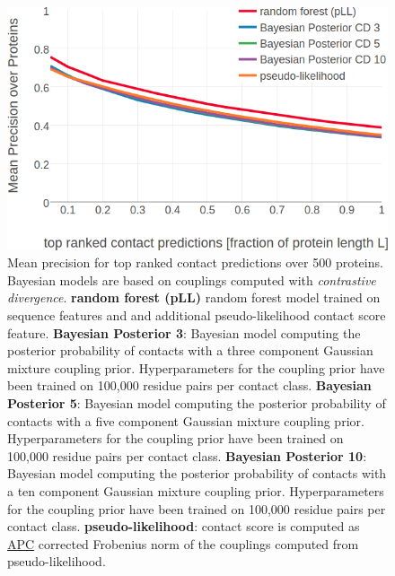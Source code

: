 \documentclass[11pt,a4paper,twoside]{book}
\theoremstyle{definition}
\theoremstyle{definition}
\theoremstyle{remark}
\begin{document}
\begin{figure}

{\centering \includegraphics[width=0.9\linewidth]{img/bayesian_model/benchmark/precision_vs_rank_cd_100k_allcomponents} 

}

\caption{Mean precision for top
ranked contact predictions over 500 proteins. Bayesian models are based
on couplings computed with \emph{contrastive divergence}. \textbf{random
forest (pLL)} random forest model trained on sequence features and and
additional pseudo-likelihood contact score feature. \textbf{Bayesian
Posterior 3}: Bayesian model computing the posterior probability of
contacts with a three component Gaussian mixture coupling prior.
Hyperparameters for the coupling prior have been trained on 100,000
residue pairs per contact class. \textbf{Bayesian Posterior 5}: Bayesian
model computing the posterior probability of contacts with a five
component Gaussian mixture coupling prior. Hyperparameters for the
coupling prior have been trained on 100,000 residue pairs per contact
class. \textbf{Bayesian Posterior 10}: Bayesian model computing the
posterior probability of contacts with a ten component Gaussian mixture
coupling prior. Hyperparameters for the coupling prior have been trained
on 100,000 residue pairs per contact class. \textbf{pseudo-likelihood}:
contact score is computed as \protect\hyperlink{abbrev}{APC} corrected
Frobenius norm of the couplings computed from pseudo-likelihood.}\label{fig:precision-bayesian-model-cd-100k}
\end{figure}

\backmatter

\listoffigures
{}

\listoftables
{}
\end{document}
